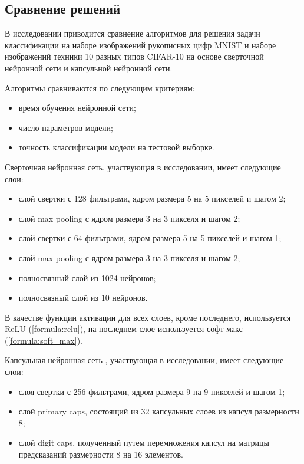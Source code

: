 \subsection{Сравнение решений}

В исследовании \cite{comparising} приводится сравнение алгоритмов для решения задачи классификации на наборе изображений рукописных цифр MNIST \cite{mnist} и наборе изображений техники 10 разных типов CIFAR-10 \cite{cifar} на основе сверточной нейронной сети и капсульной нейронной сети.

Алгоритмы сравниваются по следующим критериям:
\begin{itemize}
	\item время обучения нейронной сети;
	\item число параметров модели;
	\item точность классификации модели на тестовой выборке.
\end{itemize}

Сверточная нейронная сеть, участвующая в исследовании, имеет следующие слои:
\begin{itemize}
	\item слой свертки с 128 фильтрами, ядром размера 5 на 5 пикселей и шагом 2;
	\item слой max pooling с ядром размера 3 на 3 пикселя и шагом 2;
	\item слой свертки с 64 фильтрами, ядром размера 5 на 5 пикселей и шагом 1;
	\item слой max pooling с ядром размера 3 на 3 пикселя и шагом 2;
	\item полносвязный слой из 1024 нейронов;
	\item полносвязный слой из 10 нейронов.
\end{itemize}
В качестве функции активации для всех слоев, кроме последнего, используется ReLU (\ref{formula:relu}), на последнем слое используется софт макс (\ref{formula:soft_max}).

Капсульная нейронная сеть , участвующая в исследовании, имеет следующие слои:
\begin{itemize}
	\item слоя свертки с 256 фильтрами, ядром размера 9 на 9 пикселей и шагом 1;
	\item слой primary caps, состоящий из 32 капсульных слоев из капсул размерности 8;
	\item слой digit caps, полученный путем перемножения капсул на матрицы предсказаний размерности 8 на 16 элементов.
\end{itemize}


